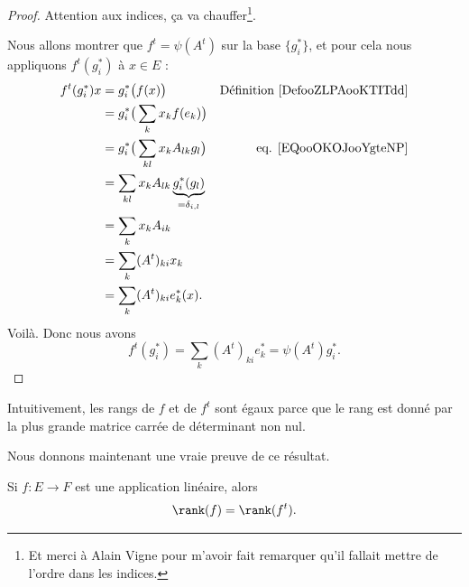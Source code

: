 \begin{proof}
	Attention aux indices, ça va chauffer\footnote{Et merci à Alain Vigne pour m'avoir fait remarquer qu'il fallait mettre de l'ordre dans les indices.}.

	Nous allons montrer que \( f^t=\psi(A^t)\) sur la base \( \{ g_i^* \}\), et pour cela nous appliquons \( f^t(g_i^*)\) à \( x\in E\) :
	\begin{subequations}
		\begin{align}
			f^t(g_i^*)x & =g_i^*\big( f(x) \big)                                     & \text{Définition  \ref{DefooZLPAooKTITdd}} \\
			            & =g_i^*\big( \sum_kx_kf(e_k) \big)                                                                       \\
			            & =g_i^*\big( \sum_{kl}x_kA_{lk}g_l \big)                    & \text{eq. \eqref{EQooOKOJooYgteNP}}        \\
			            & =\sum_{kl}x_kA_{lk}\underbrace{g_i^*(g_l)}_{=\delta_{i,l}}                                              \\
			            & =\sum_kx_kA_{ik}                                                                                        \\
			            & =\sum_k(A^t)_{ki}x_k                                                                                    \\
			            & =\sum_k(A^t)_{ki}e^*_k(x).
		\end{align}
	\end{subequations}
	Voilà. Donc nous avons
	\begin{equation}
		f^t(g_i^*)=\sum_k(A^t)_{ki}e^*_k=\psi(A^t)g_i^*.
	\end{equation}
\end{proof}

\begin{normaltext}
	Intuitivement,  les rangs de \( f\) et de \( f^t\) sont égaux parce que le rang est donné par la plus grande matrice carrée de déterminant non nul.

	Nous donnons maintenant une vraie preuve de ce résultat.
\end{normaltext}

\begin{lemma}   \label{LemSEpTcW}
	Si \( f\colon E\to F\) est une application linéaire, alors
	\begin{equation}
		\rank(f)=\rank(f^t).
	\end{equation}
\end{lemma}

